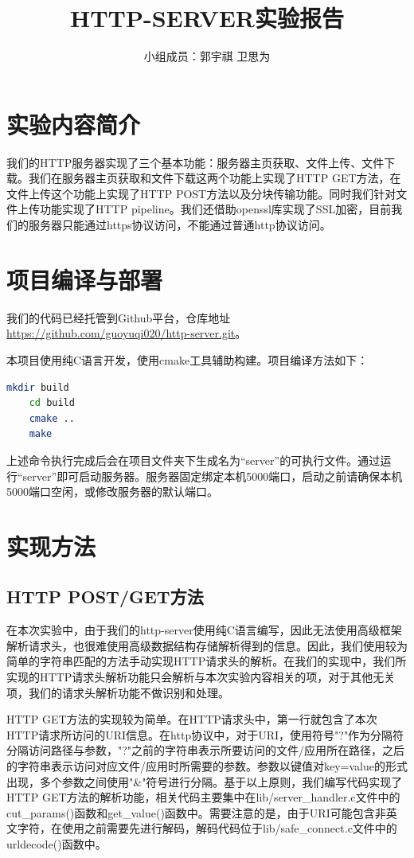 \documentclass[a4paper]{article}
\begin{document}
 
\title{HTTP-SERVER实验报告}
\author{小组成员：郭宇祺 \; 卫思为}
\date{}
\maketitle
\normalsize
\section{实验内容简介}
我们的HTTP服务器实现了三个基本功能：服务器主页获取、文件上传、文件下载。我们在服务器主页获取和文件下载这两个功能上实现了HTTP GET方法，在文件上传这个功能上实现了HTTP POST方法以及分块传输功能。同时我们针对文件上传功能实现了HTTP pipeline。我们还借助openssl库实现了SSL加密，目前我们的服务器只能通过https协议访问，不能通过普通http协议访问。

\section{项目编译与部署}
我们的代码已经托管到Github平台，仓库地址\href{https://github.com/guoyuqi020/http-server}{https://github.com/guoyuqi020/http-server.git}。

本项目使用纯C语言开发，使用cmake工具辅助构建。项目编译方法如下：
\begin{lstlisting}[language=bash]
	mkdir build
	cd build
	cmake ..
	make
\end{lstlisting}
上述命令执行完成后会在项目文件夹下生成名为“server”的可执行文件。通过运行“server”即可启动服务器。服务器固定绑定本机5000端口，启动之前请确保本机5000端口空闲，或修改服务器的默认端口。

\section{实现方法}
\subsection{HTTP POST/GET方法}
在本次实验中，由于我们的http-server使用纯C语言编写，因此无法使用高级框架解析请求头，也很难使用高级数据结构存储解析得到的信息。因此，我们使用较为简单的字符串匹配的方法手动实现HTTP请求头的解析。在我们的实现中，我们所实现的HTTP请求头解析功能只会解析与本次实验内容相关的项，对于其他无关项，我们的请求头解析功能不做识别和处理。

HTTP GET方法的实现较为简单。在HTTP请求头中，第一行就包含了本次HTTP请求所访问的URI信息。在http协议中，对于URI，使用符号"?"作为分隔符分隔访问路径与参数，"?"之前的字符串表示所要访问的文件/应用所在路径，之后的字符串表示访问对应文件/应用时所需要的参数。参数以键值对key=value的形式出现，多个参数之间使用"\&"符号进行分隔。基于以上原则，我们编写代码实现了HTTP GET方法的解析功能，相关代码主要集中在lib/server\_handler.c文件中的cut\_params()函数和get\_value()函数中。需要注意的是，由于URI可能包含非英文字符，在使用之前需要先进行解码，解码代码位于lib/safe\_connect.c文件中的urldecode()函数中。
\end{document}
